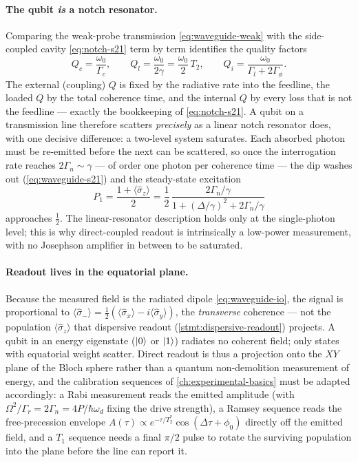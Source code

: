 \paragraph{The qubit \emph{is} a notch resonator.}
Comparing the weak-probe transmission \cref{eq:waveguide-weak} with the
side-coupled cavity \cref{eq:notch-s21} term by term identifies the
quality factors
\begin{equation}
\label{eq:waveguide-Q}
Q_c=\frac{\omega_0}{\Gamma_c},\qquad
Q_l=\frac{\omega_0}{2\gamma}=\frac{\omega_0}{2}\,T_2,\qquad
Q_i=\frac{\omega_0}{\Gamma_l+2\Gamma_\phi}.
\end{equation}
The external (coupling) $Q$ is fixed by the radiative rate into the
feedline, the loaded $Q$ by the total coherence time, and the internal
$Q$ by every loss that is not the feedline --- exactly the bookkeeping
of \cref{eq:notch-s21}. A qubit on a transmission line therefore
scatters \emph{precisely} as a linear notch resonator does, with one
decisive difference: a two-level system saturates. Each absorbed photon
must be re-emitted before the next can be scattered, so once the
interrogation rate reaches $2\Gamma_n\sim\gamma$ --- of order one
photon per coherence time --- the dip washes out
(\cref{eq:waveguide-s21}) and the steady-state excitation
\begin{equation}
\label{eq:waveguide-p1}
P_1=\frac{1+\langle\hat\sigma_z\rangle}{2}
   =\frac12\,\frac{2\Gamma_n/\gamma}{1+(\Delta/\gamma)^2+2\Gamma_n/\gamma}
\end{equation}
approaches $\tfrac12$. The linear-resonator description holds only at
the single-photon level; this is why direct-coupled readout is
intrinsically a low-power measurement, with no Josephson amplifier in
between to be saturated.

\paragraph{Readout lives in the equatorial plane.}
Because the measured field is the radiated dipole
\cref{eq:waveguide-io}, the signal is proportional to
$\langle\hat\sigma_-\rangle=\tfrac12(\langle\hat\sigma_x\rangle-i\langle\hat\sigma_y\rangle)$,
the \emph{transverse} coherence --- not the population
$\langle\hat\sigma_z\rangle$ that dispersive readout
(\cref{stmt:dispersive-readout}) projects. A qubit in an energy
eigenstate ($\ket0$ or $\ket1$) radiates no coherent field; only states
with equatorial weight scatter. Direct readout is thus a projection
onto the $XY$ plane of the Bloch sphere rather than a quantum
non-demolition measurement of energy, and the calibration sequences of
\cref{ch:experimental-basics} must be adapted accordingly: a Rabi
measurement reads the emitted amplitude (with
$\Omega^2/\Gamma_r=2\Gamma_n=4P/\hbar\omega_d$ fixing the drive
strength), a Ramsey sequence reads the free-precession envelope
$A(\tau)\propto e^{-\tau/T_2^*}\cos(\Delta\tau+\phi_0)$ directly off the
emitted field, and a $T_1$ sequence needs a final $\pi/2$ pulse to
rotate the surviving population into the plane before the line can
report it.

